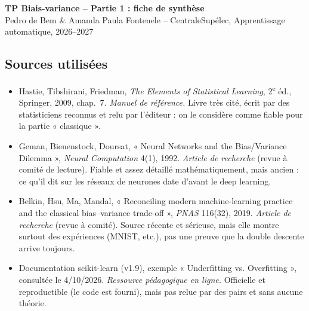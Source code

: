 \documentclass[10pt,a4paper]{article}
\begin{document}
\begin{center}
{\large\textbf{TP Biais-variance -- Partie 1 : fiche de synthèse}}\\[1pt]
Pedro de Bem \& Amanda Paula Fontenele -- CentraleSupélec, Apprentissage automatique, 2026--2027
\end{center}
\vspace{-6pt}

\subsection*{Sources utilisées}
\begin{itemize}
  \item [HTF] Hastie, Tibshirani, Friedman, \emph{The Elements of Statistical Learning}, 2\textsuperscript{e} éd., Springer, 2009, chap.~7. \emph{Manuel de référence.} Livre très cité, écrit par des statisticiens reconnus et relu par l'éditeur : on le considère comme fiable pour la partie « classique ».
  \item [GBD] Geman, Bienenstock, Doursat, « Neural Networks and the Bias/Variance Dilemma », \emph{Neural Computation} 4(1), 1992. \emph{Article de recherche} (revue à comité de lecture). Fiable et assez détaillé mathématiquement, mais ancien : ce qu'il dit sur les réseaux de neurones date d'avant le deep learning.
  \item [BHMM] Belkin, Hsu, Ma, Mandal, « Reconciling modern machine-learning practice and the classical bias--variance trade-off », \emph{PNAS} 116(32), 2019. \emph{Article de recherche} (revue à comité). Source récente et sérieuse, mais elle montre surtout des expériences (MNIST, etc.), pas une preuve que la double descente arrive toujours.
  \item [SKL] Documentation scikit-learn (v1.9), exemple « Underfitting vs. Overfitting », consultée le 4/10/2026. \emph{Ressource pédagogique en ligne.} Officielle et reproductible (le code est fourni), mais pas relue par des pairs et sans aucune théorie.
\end{itemize}
\end{document}
